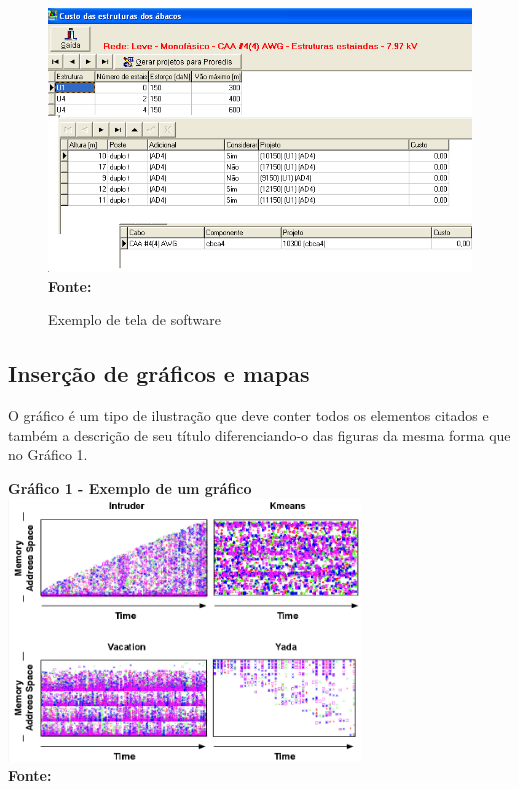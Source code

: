 \begin{figure}[!ht]
	\centering	
	\caption[\hspace{0.1cm}Exemplo de tela de software.]{Exemplo de tela de software}
	  \vspace{-0.4cm}
	\includegraphics[width=.8\textwidth]{figuras/tela1.png}
	 \vspace{-0.3cm}
	\\\textbf{\footnotesize Fonte: \cite{tela1}}
	\label{fig:tela1}
\end{figure}

\subsection{\esp Inserção de gráficos e mapas}

O gráfico é um tipo de ilustração que deve conter todos os elementos citados e também a descrição de seu título
diferenciando-o das figuras da mesma forma que no Gráfico 1. 

\begin{center}
	\centering	
 	\textbf{Gráfico 1 - Exemplo de um gráfico} \\
	\includegraphics[width=0.7\textwidth]{figuras/access.png}
	 \vspace{-0.3cm}
	\\\textbf{\footnotesize Fonte: \cite{tese}}
	\label{grafico1}
\end{center}

